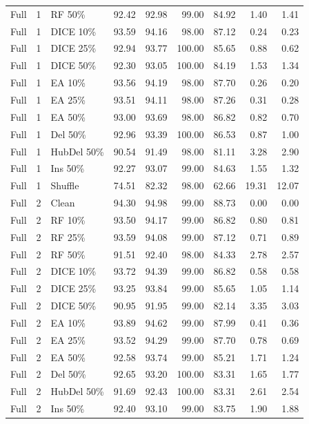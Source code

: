 {\begin{longtable}{rllrrrrrr}
Full & 1 & RF 50\% & 92.42 & 92.98 & 99.00 & 84.92 & 1.40 & 1.41 \\
Full & 1 & DICE 10\% & 93.59 & 94.16 & 98.00 & 87.12 & 0.24 & 0.23 \\
Full & 1 & DICE 25\% & 92.94 & 93.77 & 100.00 & 85.65 & 0.88 & 0.62 \\
Full & 1 & DICE 50\% & 92.30 & 93.05 & 100.00 & 84.19 & 1.53 & 1.34 \\
Full & 1 & EA 10\% & 93.56 & 94.19 & 98.00 & 87.70 & 0.26 & 0.20 \\
Full & 1 & EA 25\% & 93.51 & 94.11 & 98.00 & 87.26 & 0.31 & 0.28 \\
Full & 1 & EA 50\% & 93.00 & 93.69 & 98.00 & 86.82 & 0.82 & 0.70 \\
Full & 1 & Del 50\% & 92.96 & 93.39 & 100.00 & 86.53 & 0.87 & 1.00 \\
Full & 1 & HubDel 50\% & 90.54 & 91.49 & 98.00 & 81.11 & 3.28 & 2.90 \\
Full & 1 & Ins 50\% & 92.27 & 93.07 & 99.00 & 84.63 & 1.55 & 1.32 \\
Full & 1 & Shuffle & 74.51 & 82.32 & 98.00 & 62.66 & 19.31 & 12.07 \\
Full & 2 & Clean & 94.30 & 94.98 & 99.00 & 88.73 & 0.00 & 0.00 \\
Full & 2 & RF 10\% & 93.50 & 94.17 & 99.00 & 86.82 & 0.80 & 0.81 \\
Full & 2 & RF 25\% & 93.59 & 94.08 & 99.00 & 87.12 & 0.71 & 0.89 \\
Full & 2 & RF 50\% & 91.51 & 92.40 & 98.00 & 84.33 & 2.78 & 2.57 \\
Full & 2 & DICE 10\% & 93.72 & 94.39 & 99.00 & 86.82 & 0.58 & 0.58 \\
Full & 2 & DICE 25\% & 93.25 & 93.84 & 99.00 & 85.65 & 1.05 & 1.14 \\
Full & 2 & DICE 50\% & 90.95 & 91.95 & 99.00 & 82.14 & 3.35 & 3.03 \\
Full & 2 & EA 10\% & 93.89 & 94.62 & 99.00 & 87.99 & 0.41 & 0.36 \\
Full & 2 & EA 25\% & 93.52 & 94.29 & 99.00 & 87.70 & 0.78 & 0.69 \\
Full & 2 & EA 50\% & 92.58 & 93.74 & 99.00 & 85.21 & 1.71 & 1.24 \\
Full & 2 & Del 50\% & 92.65 & 93.20 & 100.00 & 83.31 & 1.65 & 1.77 \\
Full & 2 & HubDel 50\% & 91.69 & 92.43 & 100.00 & 83.31 & 2.61 & 2.54 \\
Full & 2 & Ins 50\% & 92.40 & 93.10 & 99.00 & 83.75 & 1.90 & 1.88 \\

\end{longtable}}
